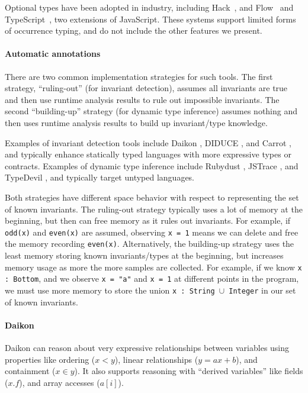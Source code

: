\documentclass[9pt]{extarticle}
\begin{document}
Optional types
have been  adopted in industry, including Hack~\cite{hack}, and Flow~\cite{flow} and
TypeScript~\cite{typescript}, two extensions of JavaScript. These
systems  support  limited forms of occurrence typing,
and do not include the other features we
present.

\paragraph{Automatic annotations}
There are two common implementation strategies for such tools. The first
strategy, ``ruling-out'' (for invariant detection), assumes all invariants are true 
and then use runtime analysis results to rule out
impossible invariants. The second ``building-up'' strategy (for dynamic type inference)
assumes nothing and then uses runtime analysis results to build up invariant/type knowledge.

Examples of invariant detection tools include Daikon \cite{Ernst06thedaikon},
DIDUCE \cite{hangal2002tracking}, and Carrot \cite{pytlik2003automated}, and
typically enhance statically typed languages with more expressive types or contracts.
Examples of dynamic type inference include Rubydust \cite{An10dynamicinference},
JSTrace \cite{saftoiu2010jstrace}, and TypeDevil \cite{pradel2015typedevil},
and typically target untyped languages.

Both strategies have different space behavior with respect to representing
the set of known invariants.
The ruling-out strategy typically uses a lot of memory at the beginning,
but then can free memory as it rules out invariants. For example, if
\texttt{odd(x)} and \texttt{even(x)} are assumed, observing \texttt{x = 1}
means we can delete and free the memory recording \texttt{even(x)}.
Alternatively, the building-up strategy uses the least memory storing
known invariants/types at the beginning, but increases memory usage
as more the more samples are collected. For example, if we know
\texttt{x : Bottom}, and we observe \texttt{x = "a"} and \texttt{x = 1}
at different points in the program, we must use more memory to
store the union \texttt{x : String $\cup$ Integer} in our set of known invariants.

\paragraph{Daikon}
Daikon can reason about very expressive relationships between variables
using properties like ordering ($x < y$), linear relationships ($y = ax + b$),
and containment ($x \in y$). It also supports reasoning with ``derived variables''
like fields ($x.f$), and array accesses ($a[i]$).
\end{document}
